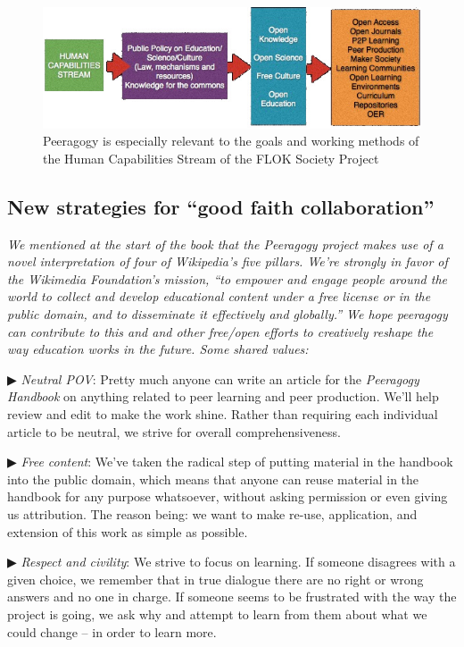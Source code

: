 \begin{figure}
\includegraphics[width=\textwidth]{../pictures/flok2.jpg}
\caption*{Peeragogy is especially relevant to the goals and working methods of the Human Capabilities Stream of the FLOK Society Project}
\end{figure}

\clearpage

\begin{mdframed}
\label{good-faith-collaboration}
\subsection{New strategies for ``good faith collaboration''}

\noindent \emph{We mentioned at the start of the book that the
  Peeragogy project makes use of a novel interpretation of four of
  Wikipedia's five pillars.  We're strongly in favor of the Wikimedia
  Foundation's mission, ``to empower and engage people around the
  world to collect and develop educational content under a free
  license or in the public domain, and to disseminate it effectively
  and globally.''  We hope peeragogy can contribute to this and and
  other free/open efforts to creatively reshape the way education
  works in the future.  Some shared values:}

▶ \emph{Neutral POV}: Pretty much anyone can write an article for the
\emph{Peeragogy Handbook} on anything related to peer learning and
peer production.  We'll help review and edit to make the work shine.
Rather than requiring each individual article to be neutral, we strive
for overall comprehensiveness.

▶ \emph{Free content}: We've taken the radical step of putting
material in the handbook into the public domain, which means that
anyone can reuse material in the handbook for any purpose whatsoever,
without asking permission or even giving us attribution.  The reason
being: we want to make re-use, application, and extension of this work
as simple as possible.

▶ \emph{Respect and civility}: We strive to focus on learning.  If
someone disagrees with a given choice, we remember that in true
dialogue there are no right or wrong answers and no one in charge.  If
someone seems to be frustrated with the way the project is going, we
ask why and attempt to learn from them about what we could change --
in order to learn more.


\end{mdframed}
